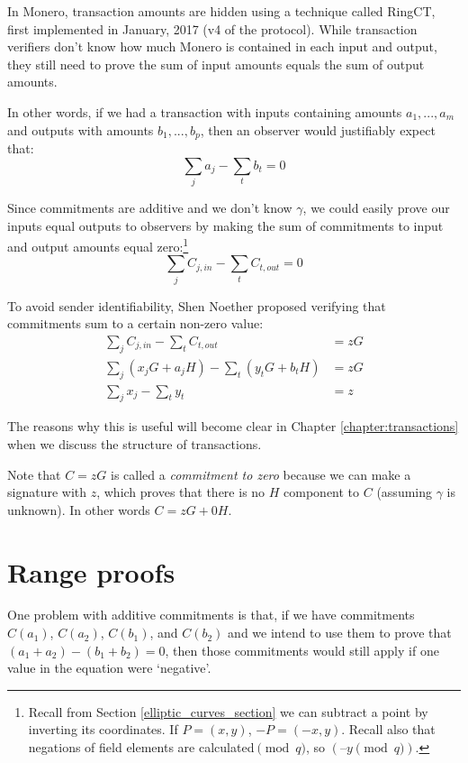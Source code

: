 In Monero, transaction amounts are hidden using a technique called RingCT, first implemented in January, 2017 (v4 of the protocol). While transaction verifiers don’t know how much Monero is contained in each input and output, they still need to prove the sum of input amounts equals the sum of output amounts. 

In other words, if we had a transaction with inputs containing amounts \(a_1, ..., a_m\) and outputs with amounts \(b_1, ..., b_p\), then an observer would justifiably expect that: \vspace{.2cm}
\[\sum_j a_j - \sum_t b_t = 0\]

Since commitments are additive and we don't know $\gamma$, we could easily prove our inputs equal outputs to observers by making the sum of commitments to input and output amounts equal zero:\footnote{Recall from Section \ref{elliptic_curves_section} we can subtract a point by inverting its coordinates. If $P = (x, y)$, $-P = (-x, y)$. Recall also that negations of field elements are calculated$\pmod q$, so $(–y \pmod q)$.}
\[\sum_{j}{C_{j, in}}     - \sum_{t}{C_{t, out}} = 0\]

To avoid sender identifiability, Shen Noether proposed \cite{MRL-0005} verifying that commitments sum to a certain non-zero value:\vspace{.2cm}
\begin{align*}
\sum_{j}{C_{j, in}}     - \sum_{t}{C_{t, out}} &= z G \\
\sum_{j}{(x_j G + a_j H)}  - \sum_{t}{(y_t G + b_t H)} &= z G \\
\sum_{j} x_j - \sum_{t} y_t &= z
\end{align*}

The reasons why this is useful will become clear in Chapter \ref{chapter:transactions} when we discuss the structure of transactions.

Note that $C = z G$ is called a {\em commitment to zero} because we can make a signature with $z$, which proves that there is no $H$ component to $C$ (assuming $\gamma$ is unknown). In other words $C = z G + 0 H$.



\section{Range proofs}
\label{sec:range_proofs}

One problem with additive commitments is that, if we have commitments $C(a_1)$, $C(a_2)$, $C(b_1)$, and $C(b_2)$ and we intend to use them to prove that $(a_1 + a_2) - (b_1 + b_2) = 0$, then those commitments would still apply if one value in the equation were `negative'.

